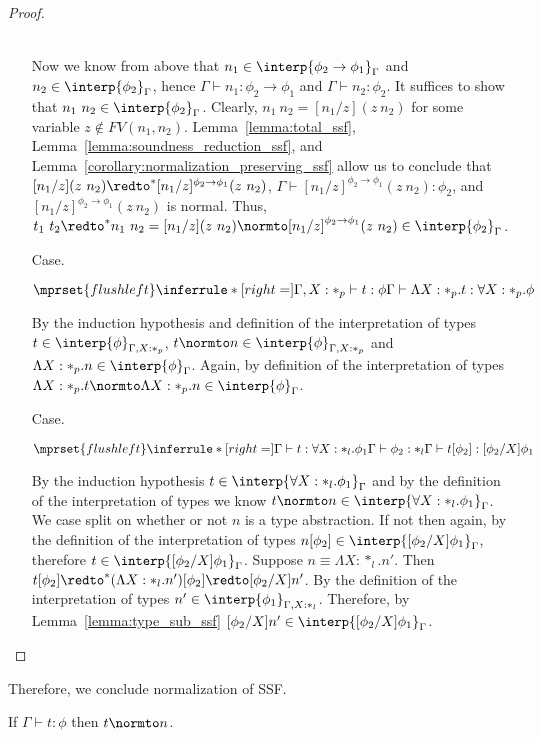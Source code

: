 \begin{proof}
\begin{itemize}
  \ \\
  Now we know from above that $n_1 \in \interp{\phi_2 \rightarrow \phi_1}_\Gamma$ and
  $n_2 \in \interp{\phi_2}_\Gamma$, hence $\Gamma \vdash n_1:\phi_2 \to \phi_1$ and
  $\Gamma \vdash n_2:\phi_2$.  It suffices to show that $n_1\ n_2 \in \interp{\phi_2}_\Gamma$.
  Clearly, $n_1\ n_2 = [n_1/z](z\ n_2)$ for some variable $z \not \in FV(n_1,n_2)$.  
  Lemma~\ref{lemma:total_ssf}, Lemma~\ref{lemma:soundness_reduction_ssf}, 
  and Lemma~\ref{corollary:normalization_preserving_ssf} allow us to conclude that 
  $[n_1/z](z\ n_2) \redto^* [n_1/z]^{\phi_2 \to \phi_1}(z\ n_2)$, $\Gamma \vdash [n_1/z]^{\phi_2 \to \phi_1}(z\ n_2):\phi_2$,
  and $[n_1/z]^{\phi_2 \to \phi_1}(z\ n_2)$ is normal.  Thus, 
  $t_1\ t_2 \redto^* n_1\ n_2 = [n_1/z](z\ n_2) \normto [n_1/z]^{\phi_2 \to \phi_1}(z\ n_2) \in \interp{\phi_2}_\Gamma$.
  
\item[Case.]\ \\
  \begin{center}
    \begin{math}
      $$\mprset{flushleft}
      \inferrule* [right=] {
        \Gamma, X : *_p \vdash t : \phi
      }{\Gamma \vdash \Lambda X:*_p.t:\forall X:*_p.\phi}
    \end{math}
  \end{center}
  By the induction hypothesis and definition of the interpretation of types 
  $t \in \interp{\phi}_{\Gamma,X:*_p}$, $t \normto n \in \interp{\phi}_{\Gamma,X:*_p}$ and 
  $\Lambda X:*_p.n \in \interp{\phi}_{\Gamma}$.  Again, by definition of the interpretation 
  of types $\Lambda X:*_p.t \normto \Lambda X:*_p.n \in \interp{\phi}_{\Gamma}$.

\item[Case.]\ \\
  \begin{center}
    \begin{math}
      $$\mprset{flushleft}
      \inferrule* [right=] {
        \Gamma \vdash t:\forall X:*_l.\phi_1
        \\
        \Gamma \vdash \phi_2:*_l
      }{\Gamma \vdash t[\phi_2]: [\phi_2/X]\phi_1}
    \end{math}
  \end{center}
  By the induction hypothesis $t \in \interp{\forall X:*_l.\phi_1}_\Gamma$ and by the 
  definition of the interpretation of types we know 
  $t \normto n \in \interp{\forall X:*_l.\phi_1}_\Gamma$.  We case
  split on whether or not $n$ is a type abstraction. If not then again, by the 
  definition of the interpretation of types 
  $n[\phi_2] \in \interp{[\phi_2/X]\phi_1}_\Gamma$, therefore 
  $t \in \interp{[\phi_2/X]\phi_1}_\Gamma$.  Suppose $n \equiv \Lambda X:*_l.n'$.  Then 
  $t[\phi_2] \redto^* (\Lambda X:*_l.n')[\phi_2] \redto [\phi_2/X]n'$.  By the definition 
  of the interpretation of types $n' \in \interp{\phi_1}_{\Gamma,X:*_l}$. Therefore, by
  Lemma~\ref{lemma:type_sub_ssf} $[\phi_2/X]n' \in \interp{[\phi_2/X]\phi_1}_{\Gamma}$.
\end{itemize}
\end{proof}
\noindent Therefore, we conclude normalization of SSF.
\begin{corollary}[Normalization]
  If $\Gamma \vdash t:\phi$ then $t \normto n$.
\end{corollary}
